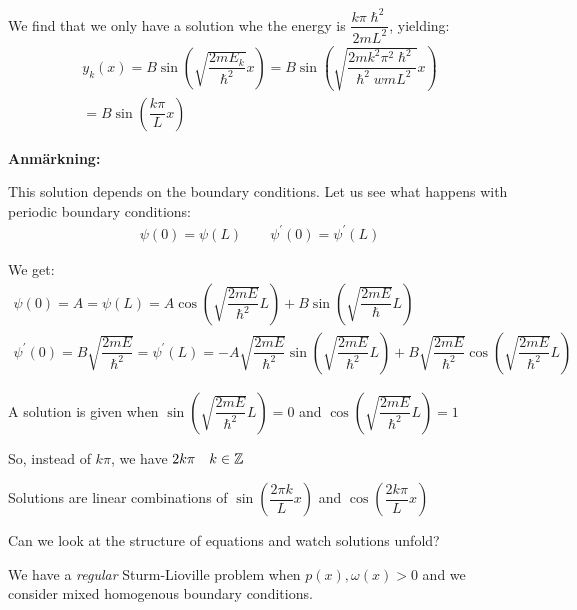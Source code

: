 \par\bigskip
\noindent We find that we only have a solution whe the energy is $\dfrac{k\pi\hslash^2}{2mL^2}$, yielding:
\begin{equation*}
  \begin{gathered}
    y_k(x) = B\sin\left(\sqrt{\dfrac{2mE_k}{\hslash^2}}x\right) = B\sin\left(\sqrt{\dfrac{2mk^2\pi^2\hslash^2}{\hslash^2wmL^2}}x\right)\\
    = B\sin\left(\dfrac{k\pi}{L}x\right)
  \end{gathered}
\end{equation*}
\par\bigskip
\noindent\textbf{Anmärkning:}\par
\noindent This solution depends on the boundary conditions. Let us see what happens with periodic boundary conditions:
\begin{equation*}
  \begin{gathered}
    \psi(0) = \psi(L)\qquad \psi^{\prime}(0) = \psi^{\prime}(L)
  \end{gathered}
\end{equation*}\par
\noindent We get:
\begin{equation*}
  \begin{gathered}
    \psi(0) = A = \psi(L) = A\cos\left(\sqrt{\dfrac{2mE}{\hslash^2}}L\right)+B\sin\left(\sqrt{\dfrac{2mE}{\hslash}}L\right)\\
    \psi^{\prime}(0) = B\sqrt{\dfrac{2mE}{\hslash^2}} = \psi^{\prime}(L) = -A\sqrt{\dfrac{2mE}{\hslash^2}}\sin\left(\sqrt{\dfrac{2mE}{\hslash^2}}L\right)+B\sqrt{\dfrac{2mE}{\hslash^2}}\cos\left(\sqrt{\dfrac{2mE}{\hslash^2}}L\right)
  \end{gathered}
\end{equation*}\par
\noindent A solution is given when $\sin\left(\sqrt{\dfrac{2mE}{\hslash^2}}L\right) = 0$ and $\cos\left(\sqrt{\dfrac{2mE}{\hslash^2}}L\right) = 1$
\par\bigskip
\noindent So, instead of $k\pi$, we have $2k\pi\quad k\in \mathbb{Z}$
\par\bigskip
\noindent Solutions are linear combinations of $\sin\left(\dfrac{2\pi k}{L}x\right)$ and $\cos\left(\dfrac{2k\pi}{L}x\right)$
\par\bigskip
\noindent Can we look at the structure of equations and watch solutions unfold?
\par\bigskip
\noindent We have a \textit{regular} Sturm-Lioville problem when $p(x), \omega(x)>0$ and we consider mixed homogenous boundary conditions.
